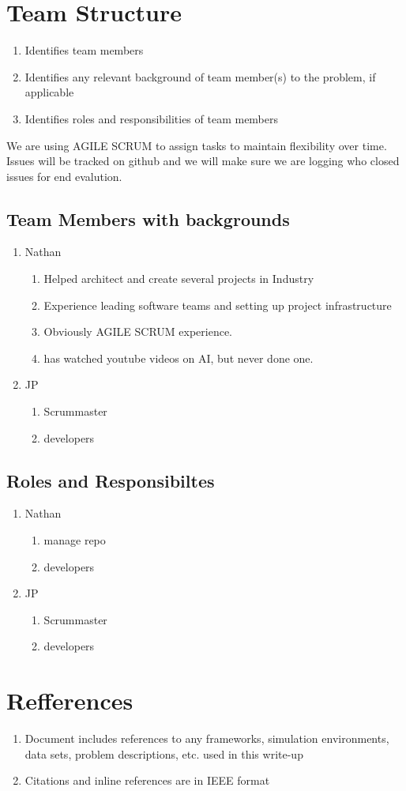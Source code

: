 \documentclass[11pt]{article}
\begin{document}
\section{Team Structure}
\begin{enumerate}
\item Identifies team members
\item Identifies any relevant background of team member(s) to the problem, if applicable
\item Identifies roles and responsibilities of team members
\end{enumerate}

We are using AGILE SCRUM to assign tasks to maintain flexibility over time. Issues will be tracked on github and
we will make sure we are logging who closed issues for end evalution.
\subsection{Team Members with backgrounds}
\begin{enumerate}
\item Nathan 
  \begin{enumerate}
  \item Helped architect and create several projects in Industry
  \item Experience leading software teams and setting up project infrastructure
  \item Obviously AGILE SCRUM experience.
  \item has watched youtube videos on AI, but never done one.
  \end{enumerate}
\item JP
  \begin{enumerate}
  \item Scrummaster
  \item developers
  \end{enumerate}
\end{enumerate}
\subsection{Roles and Responsibiltes}
\begin{enumerate}
\item Nathan
  \begin{enumerate}
  \item manage repo
  \item developers
  \end{enumerate}
\item JP
  \begin{enumerate}
  \item Scrummaster
  \item developers
  \end{enumerate}
\end{enumerate}

\section{Refferences}
\begin{enumerate}
\item Document includes references to any frameworks, simulation environments, data sets, problem descriptions,
  etc. used in this write-up
\item Citations and inline references are in IEEE format
\end{enumerate}
\printbibliography
\end{document}
